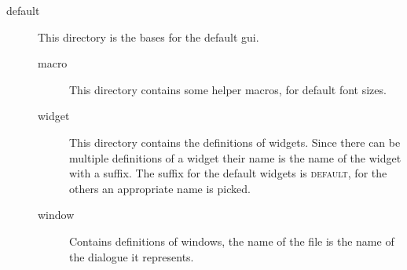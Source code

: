 \begin{description}
\begin{description}
\item[default] This directory is the bases for the default gui.

\begin{description}
\item[macro] This directory contains some helper macros, for default font sizes.
\item[widget] This directory contains the definitions of widgets. Since there
	can be multiple definitions of a widget their name is the name of the widget
	with a suffix. The suffix for the default widgets is \textsc{default}, for
	the others an appropriate name is picked.
\item[window] Contains definitions of windows, the name of the file is the
	name of the dialogue it represents.
\end{description}

\end{description}

\end{description}

